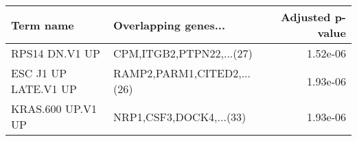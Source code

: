 \begin{tabular}{llr}
\toprule
           Term name &       Overlapping genes... &  Adjusted p-value \\
\midrule
      RPS14 DN.V1 UP &   CPM,ITGB2,PTPN22,...(27) &          1.52e-06 \\
ESC J1 UP LATE.V1 UP & RAMP2,PARM1,CITED2,...(26) &          1.93e-06 \\
   KRAS.600 UP.V1 UP &    NRP1,CSF3,DOCK4,...(33) &          1.93e-06 \\
\bottomrule
\end{tabular}
